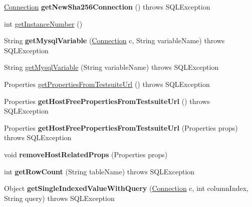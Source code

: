 \begin{DoxyCompactItemize}
\mbox{\hyperlink{interfacecom_1_1mysql_1_1jdbc_1_1_connection}{Connection}} {\bfseries get\+New\+Sha256\+Connection} ()  throws S\+Q\+L\+Exception 
\item 
int \mbox{\hyperlink{classtestsuite_1_1_base_test_case_a06bbcacd72ff13e3905c04aada69feea}{get\+Instance\+Number}} ()
\item 
\mbox{\label{classtestsuite_1_1_base_test_case_a234990bc9494798d81b98dd40e7fe4eb}} 
String {\bfseries get\+Mysql\+Variable} (\mbox{\hyperlink{interfacecom_1_1mysql_1_1jdbc_1_1_connection}{Connection}} c, String variable\+Name)  throws S\+Q\+L\+Exception 
\item 
String \mbox{\hyperlink{classtestsuite_1_1_base_test_case_ac50ae23586e12eaab184308368a6fb1d}{get\+Mysql\+Variable}} (String variable\+Name)  throws S\+Q\+L\+Exception 
\item 
Properties \mbox{\hyperlink{classtestsuite_1_1_base_test_case_ab63fc653810c4915e190196e7b3d6e6c}{get\+Properties\+From\+Testsuite\+Url}} ()  throws S\+Q\+L\+Exception 
\item 
\mbox{\label{classtestsuite_1_1_base_test_case_a5a75db77f31d0984a0d1331dc49cadc0}} 
Properties {\bfseries get\+Host\+Free\+Properties\+From\+Testsuite\+Url} ()  throws S\+Q\+L\+Exception 
\item 
\mbox{\label{classtestsuite_1_1_base_test_case_af5813dd273ec517ee7393be19e26c3e7}} 
Properties {\bfseries get\+Host\+Free\+Properties\+From\+Testsuite\+Url} (Properties props)  throws S\+Q\+L\+Exception 
\item 
\mbox{\label{classtestsuite_1_1_base_test_case_a5ca1f452f4a88327c0d35a85f1322d46}} 
void {\bfseries remove\+Host\+Related\+Props} (Properties props)
\item 
\mbox{\label{classtestsuite_1_1_base_test_case_a6a6e1d72f46dd17581da3f719a72417a}} 
int {\bfseries get\+Row\+Count} (String table\+Name)  throws S\+Q\+L\+Exception 
\item 
\mbox{\label{classtestsuite_1_1_base_test_case_a0cafe07cb8206e968a45d675446f2e48}} 
Object {\bfseries get\+Single\+Indexed\+Value\+With\+Query} (\mbox{\hyperlink{interfacecom_1_1mysql_1_1jdbc_1_1_connection}{Connection}} c, int column\+Index, String query)  throws S\+Q\+L\+Exception 

\end{DoxyCompactItemize}
